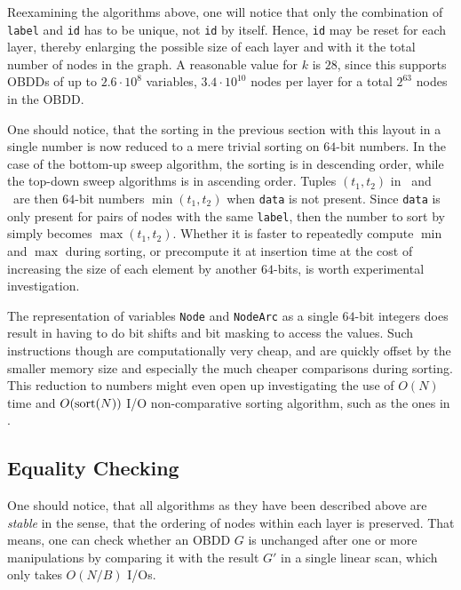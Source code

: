 Reexamining the algorithms above, one will notice that only the combination of
\lstinline{label} and \lstinline{id} has to be unique, not \lstinline{id} by
itself. Hence, \lstinline{id} may be reset for each layer, thereby enlarging the
possible size of each layer and with it the total number of nodes in the graph.
A reasonable value for $k$ is $28$, since this supports OBDDs of up to $2.6
\cdot 10^8$ variables, $3.4 \cdot 10^{10}$ nodes per layer for a total
$2^{63}$ nodes in the OBDD.

One should notice, that the sorting in the previous section with this layout in
a single number is now reduced to a mere trivial sorting on $64$-bit numbers. In
the case of the bottom-up sweep algorithm, the sorting is in descending order,
while the top-down sweep algorithms is in ascending order. Tuples $(t_1,t_2)$ in
\Apply\ and \Isomorphic\ are then $64$-bit numbers $\min(t_1,t_2)$ when
\lstinline{data} is not present. Since \lstinline{data} is only present for
pairs of nodes with the same \lstinline{label}, then the number to sort by
simply becomes $\max(t_1,t_2)$. Whether it is faster to repeatedly compute
$\min$ and $\max$ during sorting, or precompute it at insertion time at the cost
of increasing the size of each element by another $64$-bits, is worth
experimental investigation.


The representation of variables \lstinline{Node} and \lstinline{NodeArc} as a
single $64$-bit integers does result in having to do bit shifts and bit masking
to access the values. Such instructions though are computationally very cheap,
and are quickly offset by the smaller memory size and especially the much
cheaper comparisons during sorting. This reduction to numbers might even open up
investigating the use of $O(N)$ time and $O(\text{sort}(N))$ I/O non-comparative sorting
algorithm, such as the ones in \todocite.

\subsection{Equality Checking}
One should notice, that all algorithms as they have been described above are
\emph{stable} in the sense, that the ordering of nodes within each layer is
preserved. That means, one can check whether an OBDD $G$ is unchanged after one
or more manipulations by comparing it with the result $G'$ in a single linear
scan, which only takes $O(N/B)$ I/Os.

